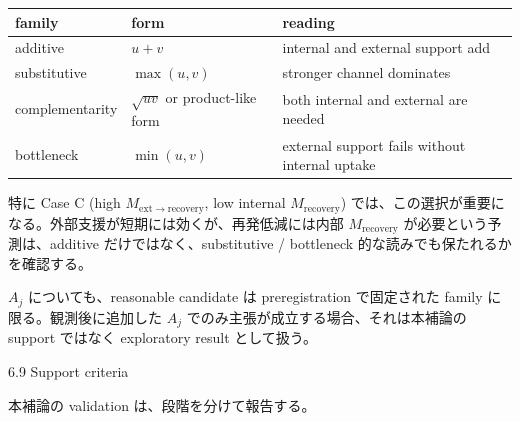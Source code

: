 \documentclass[12pt,a4paper]{article}
\begin{document}
{\def\LTcaptype{table} %
\begin{longtable}[]{@{}
  >{\raggedright\arraybackslash}p{}
  >{\raggedright\arraybackslash}p{}
  >{\raggedright\arraybackslash}p{}@{}}
\toprule\noalign{}
\begin{minipage}[b]{\linewidth}\raggedright
family
\end{minipage} & \begin{minipage}[b]{\linewidth}\raggedright
form
\end{minipage} & \begin{minipage}[b]{\linewidth}\raggedright
reading
\end{minipage} \\
\midrule\noalign{}
\endhead
\bottomrule\noalign{}
\endlastfoot
additive & \(u+v\) & internal and external support add \\
substitutive & \(\max(u,v)\) & stronger channel dominates \\
complementarity & \(\sqrt{uv}\) or product-like form & both internal and external are needed \\
bottleneck & \(\min(u,v)\) & external support fails without internal uptake \\
\end{longtable}
}

特に Case C (high \(M_{\mathrm{ext}\to\mathrm{recovery}}\), low internal \(M_{\mathrm{recovery}}\)) では、この選択が重要になる。外部支援が短期には効くが、再発低減には内部 \(M_{\mathrm{recovery}}\) が必要という予測は、additive だけではなく、substitutive / bottleneck 的な読みでも保たれるかを確認する。

\(A_j\) についても、reasonable candidate は preregistration で固定された family に限る。観測後に追加した \(A_j\) でのみ主張が成立する場合、それは本補論の support ではなく exploratory result として扱う。

6.9 Support criteria

本補論の validation は、段階を分けて報告する。
\end{document}
